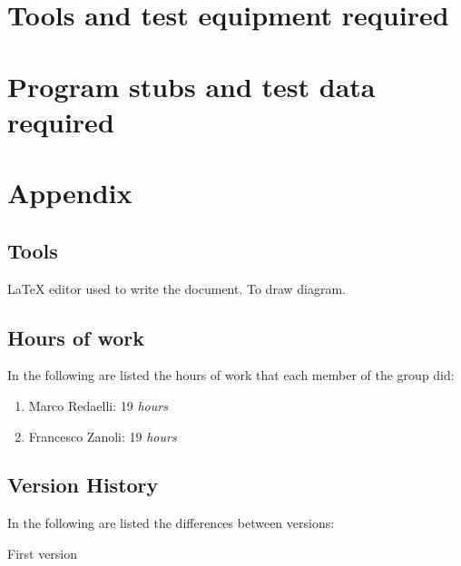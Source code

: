 \documentclass{../Common/Structure/doc_pdf}
\begin{document}
\chapter{Tools and test equipment required}


\chapter{Program stubs and test data required}


\appendix
\chapter{Appendix}

\section{Tools}
\begin{itemize}
	 \LaTeX{} editor used to write the document.
	 To draw diagram.\end{itemize}
\section{Hours of work}
In the following are listed the hours of work that each member of the group did:
\begin{enumerate}
	\item Marco Redaelli: 19 \emph{hours}
	\item Francesco Zanoli: 19 \emph{hours}
\end{enumerate}
\section{Version History}
In the following are listed the differences between versions:
\begin{enumerate}
	 First version
\end{enumerate}
\end{document}

